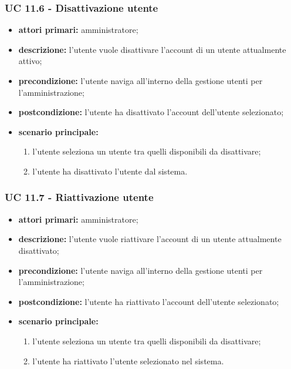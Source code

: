 			\subsubsection{UC 11.6 - Disattivazione utente}
			\begin{itemize}
				\item \textbf{attori primari:} amministratore;
				\item \textbf{descrizione:} l'utente vuole disattivare l'account di un utente attualmente attivo;
				\item \textbf{precondizione:} l'utente naviga all'interno della gestione utenti per l'amministrazione;
				\item \textbf{postcondizione:} l'utente ha disattivato l'account dell'utente selezionato;
				\item \textbf{scenario principale:}
				\begin{enumerate}
					\item{l'utente seleziona un utente tra quelli disponibili da disattivare;}
					\item{l'utente ha disattivato l'utente dal sistema.}
				\end{enumerate}
			\end{itemize}

			\subsubsection{UC 11.7 - Riattivazione utente}
			\begin{itemize}
				\item \textbf{attori primari:} amministratore;
				\item \textbf{descrizione:} l'utente vuole riattivare l'account di un utente attualmente disattivato;
				\item \textbf{precondizione:} l'utente naviga all'interno della gestione utenti per l'amministrazione;
				\item \textbf{postcondizione:} l'utente ha riattivato l'account dell'utente selezionato;
				\item \textbf{scenario principale:}
				\begin{enumerate}
					\item{l'utente seleziona un utente tra quelli disponibili da disattivare;}
					\item{l'utente ha riattivato l'utente selezionato nel sistema.}
				\end{enumerate}
			\end{itemize}



			
